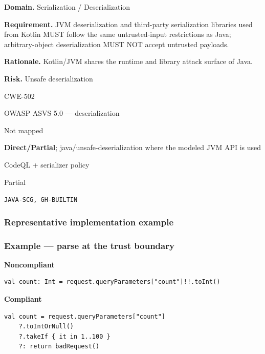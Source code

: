 \documentclass[10pt,letterpaper]{article}
\newcommand{\prioritybadge}[2]{\tcbox[on line,boxrule=0pt,arc=1.2mm,boxsep=0.7mm,left=1mm,right=1mm,top=0.4mm,bottom=0.4mm,colback=#2!12,coltext=#2]{\scriptsize\bfseries #1}}
\begin{document}
\begin{rulebox}[title={\texttt{SCS-KOTLIN-DESER-001} \hfill \prioritybadge{Critical Control}{Critical}}]
\textbf{Domain.} Serialization / Deserialization

\textbf{Requirement.} JVM deserialization and third-party serialization libraries used from Kotlin MUST follow the same untrusted-input restrictions as Java; arbitrary-object deserialization MUST NOT accept untrusted payloads.

\textbf{Rationale.} Kotlin/JVM shares the runtime and library attack surface of Java.

\textbf{Risk.} Unsafe deserialization

\begin{description}[leftmargin=2.65cm,labelwidth=2.3cm,style=nextline,itemsep=1pt,topsep=3pt]
  \item[CWE] CWE-502
  \item[OWASP] OWASP ASVS 5.0 --- deserialization
  \item[CERT] Not mapped
  \item[CodeQL] \textbf{Direct/Partial}; java/unsafe-deserialization where the modeled JVM API is used
  \item[Enforcement] CodeQL + serializer policy
  \item[Automation] Partial
  \item[Sources] \texttt{JAVA-SCG, GH-BUILTIN}
\end{description}
\end{rulebox}
\subsubsection*{Representative implementation example}
\subsubsection*{Example --- parse at the trust boundary}

\textbf{Noncompliant}\par
\begin{lstlisting}
val count: Int = request.queryParameters["count"]!!.toInt()
\end{lstlisting}

\textbf{Compliant}\par
\begin{lstlisting}
val count = request.queryParameters["count"]
    ?.toIntOrNull()
    ?.takeIf { it in 1..100 }
    ?: return badRequest()
\end{lstlisting}
\end{document}
